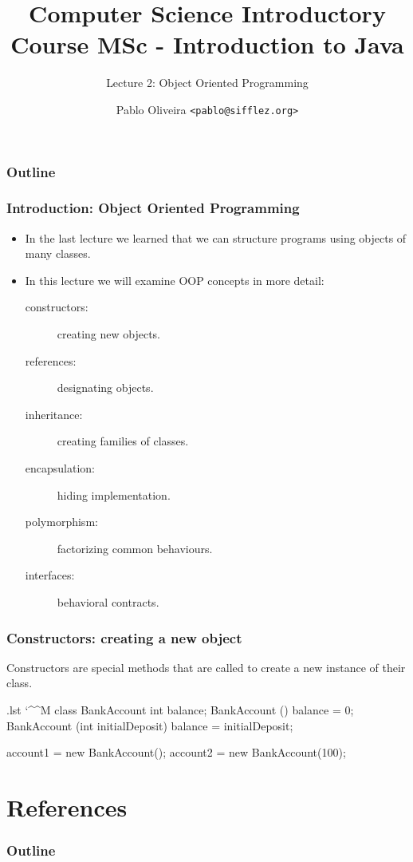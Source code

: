 \documentclass[10pt, handout]{beamer}
\title{Computer Science Introductory Course MSc - Introduction to Java}
\subtitle{Lecture 2: Object Oriented Programming}
\author[Pablo Oliveira]{Pablo Oliveira \texttt{<pablo@sifflez.org>}}
\institute{T\'el\'ecom ParisTech}
\date{}
\makeatletter
\newenvironment{code}{%
  \begingroup
  \@bsphack
  \immediate\openout\lstvrb@out\jobname.lst
  \let\do\@makeother\dospecials\catcode`\^^M\active
  \def\verbatim@processline{%
    \immediate\write\lstvrb@out{\the\verbatim@line}}%
  \verbatim@start}{%
  \immediate\closeout\lstvrb@out
  \@esphack
  \endgroup
  
  \begin{alertblock}{}
    
  \end{alertblock}}
\makeatother
\begin{document}
\begin{frame}
  \titlepage
\end{frame}

\begin{frame}
  \frametitle{Outline}
  \tableofcontents
\end{frame}

\begin{frame}[fragile]
  \frametitle{Introduction: Object Oriented Programming}
  \begin{itemize}
    \item In the last lecture we learned that we can structure programs using 
          objects of many classes.
    \item In this lecture we will examine OOP concepts in more detail:
      \begin{description}
        \item[constructors:] creating new objects. 
        \item[references:] designating objects.
        \item[inheritance:] creating families of classes.
        \item[encapsulation:] hiding implementation.
        \item[polymorphism:] factorizing common behaviours.
        \item[interfaces:] behavioral contracts.
      \end{description}
    \end{itemize}
\end{frame}


\begin{frame}[fragile]
\frametitle{Constructors: creating a new object}

\begin{definition}
  Constructors are special methods that are called to create a new instance of their class.
\end{definition}

\begin{code}
  class BankAccount {
    int balance;
    BankAccount () {
      balance = 0;  
    }
    BankAccount (int initialDeposit){
      balance = initialDeposit;
    }
  }

  account1 = new BankAccount();
  account2 = new BankAccount(100);
\end{code}
\end{frame}

\section{References}
\begin{frame}
  \frametitle{Outline}
  \tableofcontents[currentsection]
\end{frame}
\end{document}

